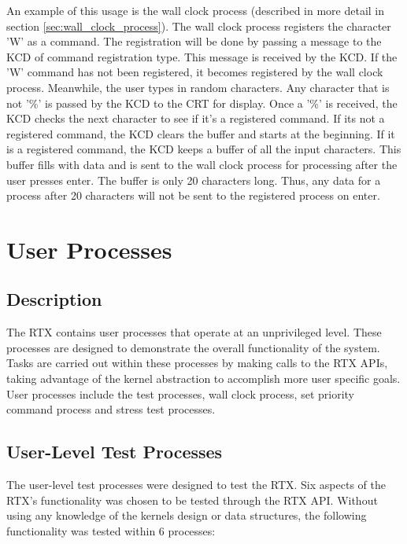 \documentclass[12pt]{report}
\begin{document}
An example of this usage is the wall clock process (described in more detail in section \ref{sec:wall_clock_process}). The wall clock process registers the character 'W' as a command. The registration will be done by passing a message to the KCD of command registration type. This message is received by the KCD. If the 'W' command has not been registered, it becomes registered by the wall clock process. Meanwhile, the user types in random characters. Any character that is not '\%' is passed by the KCD to the CRT for display. Once a '\%' is received, the KCD checks the next character to see if it's a registered command. If its not a registered command, the KCD clears the buffer and starts at the beginning. If it is a registered command, the KCD keeps a buffer of all the input characters. This buffer fills with data and is sent to the wall clock process for processing after the user presses enter. The buffer is only 20 characters long. Thus, any data for a process after 20 characters will not be sent to the registered process on enter.

\section{User Processes}
\label{sec:user_processes}

\subsection{Description}
The RTX contains user processes that operate at an unprivileged level. These processes are designed to demonstrate the overall functionality of the system. Tasks are carried out within these processes by making calls to the RTX APIs, taking advantage of the kernel abstraction to accomplish more user specific goals. User processes include the test processes, wall clock process, set priority command process and stress test processes.


\subsection{User-Level Test Processes}
The user-level test processes were designed to test the RTX. Six aspects of the RTX’s functionality was chosen to be tested through the RTX API. Without using any knowledge of the kernels design or data structures, the following functionality was tested within 6 processes:
\newline
{}
\end{document}
